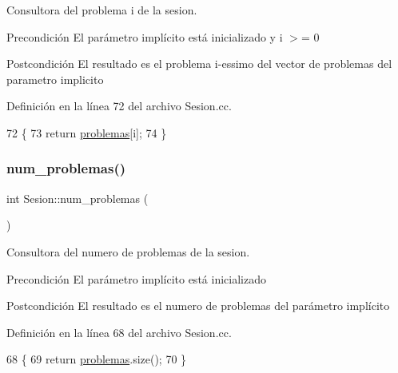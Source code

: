 Consultora del problema i de la sesion. 

\begin{DoxyPrecond}{Precondición}
El parámetro implícito está inicializado y i $>$= 0 
\end{DoxyPrecond}
\begin{DoxyPostcond}{Postcondición}
El resultado es el problema i-\/essimo del vector de problemas del parametro implicito 
\end{DoxyPostcond}


Definición en la línea 72 del archivo Sesion.\+cc.


\begin{DoxyCode}
72                                        \{
73   \textcolor{keywordflow}{return} \mbox{\hyperlink{class_sesion_af3929f5b3478c9ab1334b4c62566d69e}{problemas}}[i];
74 \}
\end{DoxyCode}
\mbox{\label{class_sesion_a7778f2d0cfff81138221fe661ab69e2c}} 
\subsubsection{\texorpdfstring{num\+\_\+problemas()}{num\_problemas()}}
{\footnotesize\ttfamily int Sesion\+::num\+\_\+problemas (\begin{DoxyParamCaption}{ }\end{DoxyParamCaption})}



Consultora del numero de problemas de la sesion. 

\begin{DoxyPrecond}{Precondición}
El parámetro implícito está inicializado 
\end{DoxyPrecond}
\begin{DoxyPostcond}{Postcondición}
El resultado es el numero de problemas del parámetro implícito 
\end{DoxyPostcond}


Definición en la línea 68 del archivo Sesion.\+cc.


\begin{DoxyCode}
68                           \{
69   \textcolor{keywordflow}{return} \mbox{\hyperlink{class_sesion_af3929f5b3478c9ab1334b4c62566d69e}{problemas}}.size();
70 \}
\end{DoxyCode}
\mbox{\label{class_sesion_a3ba86990204dd799378a62b90cfbb58a}} 
